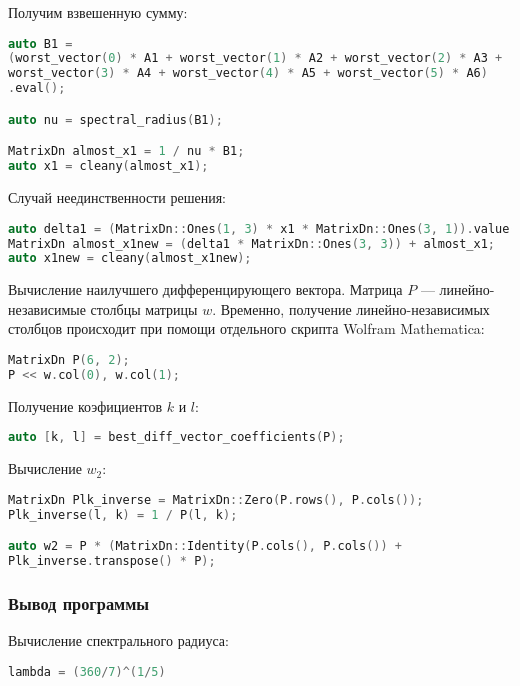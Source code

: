 \documentclass[specialist,
  substylefile = spbu.rtx,
  href,
  colorlinks=true,
  12pt]{disser}
\begin{document}
Получим взвешенную сумму:
\begin{lstlisting}[language=c++,basicstyle=\footnotesize\ttfamily]
auto B1 =
(worst_vector(0) * A1 + worst_vector(1) * A2 + worst_vector(2) * A3 +
worst_vector(3) * A4 + worst_vector(4) * A5 + worst_vector(5) * A6)
.eval();

auto nu = spectral_radius(B1);

MatrixDn almost_x1 = 1 / nu * B1;
auto x1 = cleany(almost_x1);
\end{lstlisting}

Случай неединственности решения:
\begin{lstlisting}[language=c++,basicstyle=\footnotesize\ttfamily]
auto delta1 = (MatrixDn::Ones(1, 3) * x1 * MatrixDn::Ones(3, 1)).value();
MatrixDn almost_x1new = (delta1 * MatrixDn::Ones(3, 3)) + almost_x1;
auto x1new = cleany(almost_x1new);
\end{lstlisting}


Вычисление наилучшего дифференцирующего вектора.
Матрица $P$ --- линейно-независимые столбцы матрицы $w$.
Временно, получение линейно-независимых столбцов происходит
при помощи отдельного скрипта Wolfram Mathematica:
\begin{lstlisting}[language=c++,basicstyle=\footnotesize\ttfamily]
MatrixDn P(6, 2);
P << w.col(0), w.col(1);
\end{lstlisting}

Получение коэфициентов $k$ и $l$:
\begin{lstlisting}[language=c++,basicstyle=\footnotesize\ttfamily]
auto [k, l] = best_diff_vector_coefficients(P);
\end{lstlisting}


Вычисление $w_2$:
\begin{lstlisting}[language=c++,basicstyle=\footnotesize\ttfamily]
MatrixDn Plk_inverse = MatrixDn::Zero(P.rows(), P.cols());
Plk_inverse(l, k) = 1 / P(l, k);

auto w2 = P * (MatrixDn::Identity(P.cols(), P.cols()) +
Plk_inverse.transpose() * P);
\end{lstlisting}
	
\subsubsection{Вывод программы}

Вычисление  спектрального радиуса:
\begin{lstlisting}[language=c++,basicstyle=\footnotesize\ttfamily]
	lambda = (360/7)^(1/5)
\end{lstlisting}
\end{document}
